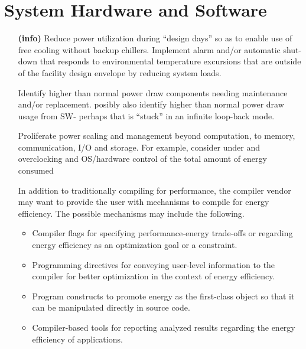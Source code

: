 \section{System Hardware and Software}
\begin{itemize}
\item[\textbf{(info)}]
Reduce power utilization during ``design days'' so as to enable use of free cooling 
without backup chillers.  Implement alarm and/or automatic shut-down that responds to environmental 
temperature excursions that are outside of the facility design envelope by reducing system loads.  

Identify higher than normal power draw components needing maintenance and/or replacement.   
posibly also identify higher than normal power draw usage from SW- perhaps 
that is ``stuck'' in an infinite loop-back mode.     

Proliferate power scaling and management beyond computation, to memory, communication, 
I/O and storage.  For example, consider under and overclocking and OS/hardware control of the 
total amount of energy consumed 

In addition to traditionally compiling for performance, the compiler vendor may want 
to provide the user with mechanisms to compile for energy efficiency. The possible mechanisms 
may include the following.

\begin{itemize}
\item
Compiler flags for specifying performance-energy trade-offs or regarding energy efficiency 
as an optimization goal or a constraint.
\item
Programming directives for conveying user-level information to the compiler for 
better optimization in the context of energy efficiency.
\item
Program constructs to promote energy as the first-class object so that it can be 
manipulated directly in source code.
\item
Compiler-based tools for reporting analyzed results regarding the energy efficiency of applications.     
\end{itemize}
\end{itemize}

